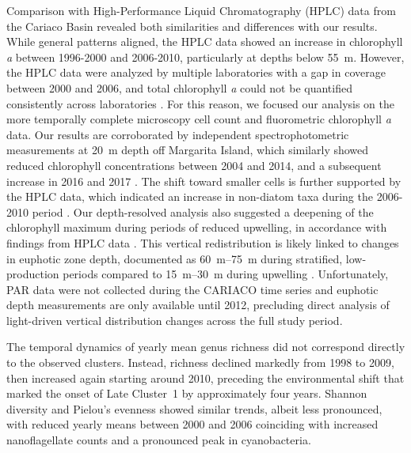 \documentclass[]{agujournal2019}
\begin{document}
    Comparison with High-Performance Liquid Chromatography (HPLC) data from the Cariaco Basin \cite{pinckney_phytoplankton_2015} revealed both similarities and differences with our results. While general patterns aligned, the HPLC data showed an increase in chlorophyll \textit{a} between 1996-2000 and 2006-2010, particularly at depths below \qty{55}{\meter}. However, the HPLC data were analyzed by multiple laboratories with a gap in coverage between 2000 and 2006, and total chlorophyll \textit{a} could not be quantified consistently across laboratories \cite{pinckney_phytoplankton_2015}. For this reason, we focused our analysis on the more temporally complete microscopy cell count and fluorometric chlorophyll \textit{a} data. Our results are corroborated by independent spectrophotometric measurements at \qty{20}{\meter} depth off Margarita Island, which similarly showed reduced chlorophyll concentrations between 2004 and 2014, and a subsequent increase in 2016 and 2017 \cite{gomez_gaspar_variacion_2025}. The shift toward smaller cells is further supported by the HPLC data, which indicated an increase in non-diatom taxa during the 2006-2010 period \cite{pinckney_phytoplankton_2015}.
     Our depth-resolved analysis also suggested a deepening of the chlorophyll maximum during periods of reduced upwelling, in accordance with findings from HPLC data \cite{pinckney_phytoplankton_2015}. This vertical redistribution is likely linked to changes in euphotic zone depth, documented as \qtyrange{60}{75}{\meter} during stratified, low-production periods compared to \qtyrange{15}{30}{\meter} during upwelling \cite{lorenzoni_characterization_2015, pinckney_phytoplankton_2015}. Unfortunately, PAR data were not collected during the CARIACO time series and euphotic depth measurements are only available until 2012, precluding direct analysis of light-driven vertical distribution changes across the full study period.


    The temporal dynamics of yearly mean genus richness did not correspond directly to the observed clusters. Instead, richness declined markedly from 1998 to 2009, then increased again starting around 2010, preceding the environmental shift that marked the onset of Late Cluster~1 by approximately four years. Shannon diversity and Pielou's evenness showed similar trends, albeit less pronounced, with reduced yearly means between 2000 and 2006 coinciding with increased nanoflagellate counts and a pronounced peak in cyanobacteria.
\end{document}
